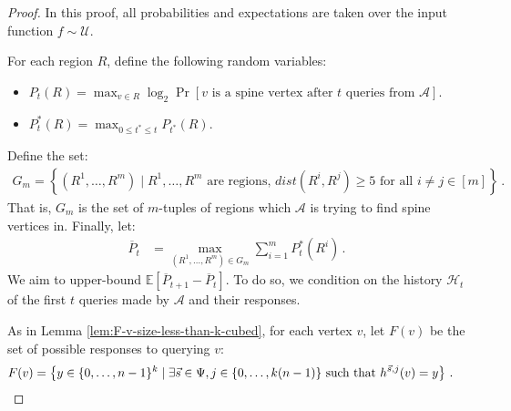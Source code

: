 \documentclass[11pt]{article}
\begin{document}
\begin{proof}
In this proof, all probabilities and expectations are taken over the input function $f \sim \mathcal{U}$.

For each region $R$, define the following random variables:
\begin{itemize}
\item $P_t(R) = \max_{v \in R} \log_2 \Pr \left[\text{$v$ is a spine vertex after $t$ queries from $\mathcal{A}$}\right] $.
\item $ P^*_t(R) = \max_{0 \leq t^* \leq t} P_{t^*}(R)$.
\end{itemize}
Define the set:
\begin{align}
    G_m = \left\{(R^1, \ldots, R^m) \mid R^1, \ldots, R^m \mbox{ are regions, } dist(R^i, R^j) \geq 5 \mbox{ for all } i \neq j \in [m]\right\} \,.
\end{align}
 That is, $G_m$ is the set of $m$-tuples of regions which $\mathcal{A}$ is trying to find spine vertices in. Finally, let:
\begin{align}
    \overline{P}_t &= \max_{(R^1, \ldots, R^m) \in G_m} \sum_{i=1}^m P^*_t(R^i) \,. 
\end{align}
We aim to upper-bound $\mathbb{E}[\overline{P}_{t+1} - \overline{P}_t]$. To do so, we condition on the history $\mathcal{H}_t$ of the first $t$ queries made by $\mathcal{A}$ and their responses.

As in Lemma \ref{lem:F-v-size-less-than-k-cubed}, for each vertex $v$, let $F(v)$ be the set of possible responses to querying $v$: 
\begin{align}
    F(v) &= \left\{y \in \{0, \ldots, n-1\}^k \mid \exists \vec{s} \in \Psi, j \in \{0, \ldots, k(n-1)\} \mbox{ such that } h^{\vec{s}, j}(v) = y\right\} \,. \notag 
\end{align}


\end{proof}
\end{document}
